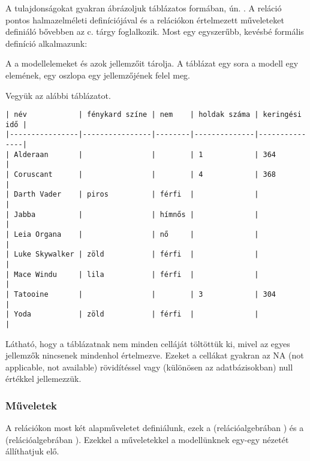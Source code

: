 A tulajdonságokat gyakran ábrázoljuk táblázatos formában, ún. . A reláció pontos halmazelméleti definíciójával és a relációkon értelmezett műveleteket definiáló  bővebben az \adatb c. tárgy foglalkozik. Most egy egyszerűbb, kevésbé formális definíció alkalmazunk:

\begin{definicio}
A  a modellelemeket és azok jellemzőit tárolja. A táblázat egy sora a modell egy elemének, egy oszlopa egy jellemzőjének felel meg.
\end{definicio}

\begin{pelda}
Vegyük az alábbi táblázatot.
\begin{verbatim}
| név            | fénykard színe | nem    | holdak száma | keringési idő |
|----------------|----------------|--------|--------------|---------------|
| Alderaan       |                |        | 1            | 364           |
| Coruscant      |                |        | 4            | 368           |
| Darth Vader    | piros          | férfi  |              |               |
| Jabba          |                | hímnős |              |               |
| Leia Organa    |                | nő     |              |               |
| Luke Skywalker | zöld           | férfi  |              |               |
| Mace Windu     | lila           | férfi  |              |               |
| Tatooine       |                |        | 3            | 304           |
| Yoda           | zöld           | férfi  |              |               |
\end{verbatim}
\end{pelda}
Látható, hogy a táblázatnak nem minden celláját töltöttük ki, mivel az egyes jellemzők nincsenek mindenhol értelmezve. Ezeket a cellákat gyakran az \textsf{NA} (not applicable, not available) rövidítéssel vagy (különösen az adatbázisokban) \textsf{null} értékkel jellemezzük.

\subsubsection{Műveletek}

A relációkon most két alapműveletet definiálunk, ezek a  (relációalgebrában ) és a  (relációalgebrában ). Ezekkel a műveletekkel a modellünknek egy-egy nézetét állíthatjuk elő.

